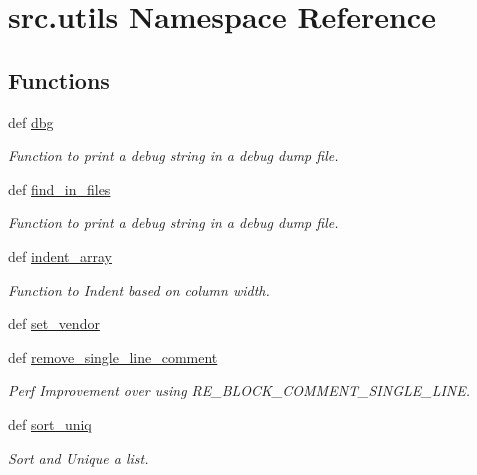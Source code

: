 \hypertarget{namespacesrc_1_1utils}{\section{src.\-utils Namespace Reference}
\label{namespacesrc_1_1utils}
}
\subsection*{Functions}
\begin{DoxyCompactItemize}
\item 
def \hyperlink{namespacesrc_1_1utils_ae09d8d0b5d446b8f1a53e96931c4a262}{dbg}
\begin{DoxyCompactList}\small\item\em Function to print a debug string in a debug dump file. \end{DoxyCompactList}\item 
def \hyperlink{namespacesrc_1_1utils_ae54ea8fbeae64940c308df9e34fdfc1a}{find\-\_\-in\-\_\-files}
\begin{DoxyCompactList}\small\item\em Function to print a debug string in a debug dump file. \end{DoxyCompactList}\item 
def \hyperlink{namespacesrc_1_1utils_a151dab3180a2e2d046115b14a07aaeee}{indent\-\_\-array}
\begin{DoxyCompactList}\small\item\em Function to Indent based on column width. \end{DoxyCompactList}\item 
def \hyperlink{namespacesrc_1_1utils_a7dbc732ca5d996f6b8f0655cae4441b6}{set\-\_\-vendor}
\item 
def \hyperlink{namespacesrc_1_1utils_aeb934e59b76906b5837a00557f0ef750}{remove\-\_\-single\-\_\-line\-\_\-comment}
\begin{DoxyCompactList}\small\item\em Perf Improvement over using R\-E\-\_\-\-B\-L\-O\-C\-K\-\_\-\-C\-O\-M\-M\-E\-N\-T\-\_\-\-S\-I\-N\-G\-L\-E\-\_\-\-L\-I\-N\-E. \end{DoxyCompactList}\item 
def \hyperlink{namespacesrc_1_1utils_afd4fc3072b618f5f6253db5b58994478}{sort\-\_\-uniq}
\begin{DoxyCompactList}\small\item\em Sort and Unique a list. \end{DoxyCompactList}\item 

\end{DoxyCompactItemize}
